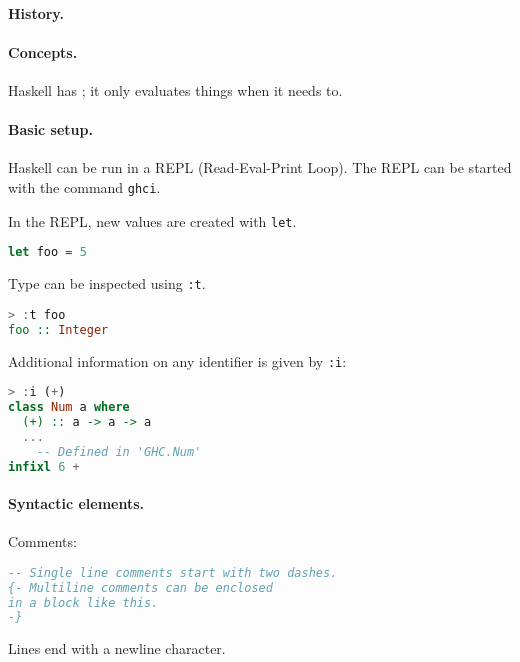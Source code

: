 \paragraph{History.}

\paragraph{Concepts.}
Haskell has ; it only evaluates things when it needs to.

\paragraph{Basic setup.}
Haskell can be run in a REPL (Read-Eval-Print Loop). The REPL can be started with the command \texttt{ghci}.

In the REPL, new values are created with \texttt{let}.
\begin{lstlisting}[language=haskell, style=snippet]
let foo = 5
\end{lstlisting}
Type can be inspected using \texttt{:t}.
\begin{lstlisting}[language=haskell, style=snippet]
> :t foo
foo :: Integer
\end{lstlisting}
Additional information on any identifier is given by \texttt{:i}:
\begin{lstlisting}[language=haskell, style=snippet]
> :i (+)
class Num a where
  (+) :: a -> a -> a
  ...
    -- Defined in 'GHC.Num'
infixl 6 +
\end{lstlisting}


\paragraph{Syntactic elements.}
Comments:
\begin{lstlisting}[language=haskell, style=snippet]
-- Single line comments start with two dashes.
{- Multiline comments can be enclosed
in a block like this.
-}
\end{lstlisting}
Lines end with a newline character.

